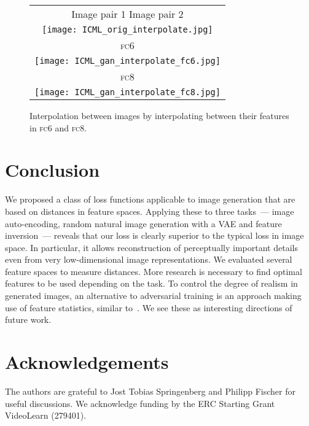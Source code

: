 \documentclass{article}
\newcommand{\fc}{\textsc{fc}}
\begin{document}
\begin{figure}
\begin{center}
\setlength{\tabcolsep}{0.1cm}
\renewcommand{\arraystretch}{1}
  \begin{tabular}{c}
  Image pair 1 \qquad\qquad\qquad\qquad Image pair 2 \\
  {\texttt{[image: ICML\_orig\_interpolate.jpg]}} \\
  \fc6 \\
  {\texttt{[image: ICML\_gan\_interpolate\_fc6.jpg]}} \\ 
  \fc8 \\
  {\texttt{[image: ICML\_gan\_interpolate\_fc8.jpg]}}
   \end{tabular}
\end{center}
   \caption{Interpolation between images by interpolating between their features in \fc6 and \fc8.}
\label{fig:AlexNet_interpol}
\end{figure}

\section{Conclusion}

We proposed a class of loss functions applicable to image generation that are based on distances in feature spaces.
Applying these to three tasks~--- image auto-encoding, random natural image generation with a VAE and feature inversion~--- reveals that our loss is clearly superior to the typical loss in image space.
In particular, it allows reconstruction of perceptually important details even from very low-dimensional image representations.
We evaluated several feature spaces to measure distances.
More research is necessary to find optimal features to be used depending on the task.
To control the degree of realism in generated images, an alternative to adversarial training is an approach making use of feature statistics, similar to~\citet{Gatys_arxiv2015}. 
We see these as interesting directions of future work.

\section*{Acknowledgements}
The authors are grateful to Jost Tobias Springenberg and Philipp Fischer for useful discussions.
We acknowledge funding by the ERC Starting Grant VideoLearn (279401).




\end{document}
